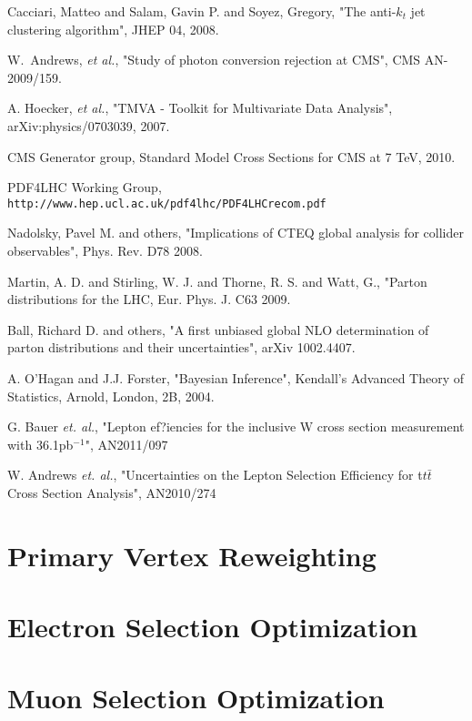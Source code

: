 \documentclass{cmspaper}
\begin{document}
Cacciari, Matteo and Salam, Gavin P. and Soyez, Gregory, "The anti-$k_t$ jet clustering 
algorithm", JHEP 04,  2008.

W.~Andrews, \textit{et al.}, "Study of photon conversion rejection at CMS", CMS AN-2009/159.

A. Hoecker, \textit{et al.}, "TMVA - Toolkit for Multivariate Data Analysis", arXiv:physics/0703039, 2007.

CMS Generator group, Standard Model Cross Sections for CMS at 7 TeV, 2010.

PDF4LHC Working Group, 
{\tt http://www.hep.ucl.ac.uk/pdf4lhc/PDF4LHCrecom.pdf}

Nadolsky, Pavel M. and others, "Implications of CTEQ global analysis for 
collider observables", Phys. Rev. D78 2008.

Martin, A. D. and Stirling, W. J. and Thorne, R. S. and Watt, G., "Parton 
distributions for the LHC, Eur. Phys. J. C63 2009.

Ball, Richard D. and others, "A first unbiased global NLO determination 
of parton distributions and their uncertainties", arXiv 1002.4407.

A. O'Hagan and J.J. Forster, "Bayesian Inference", Kendall's Advanced Theory of Statistics, 
Arnold, London, 2B, 2004.

G. Bauer {\it et. al.}, "Lepton ef?iencies for the inclusive W cross section measurement with 36.1pb$^{-1}$", AN2011/097

W. Andrews {\it et. al.}, "Uncertainties on the Lepton Selection Efficiency for t$t\bar{t}$ Cross Section Analysis", AN2010/274


\appendix
\appendixpage
  \section{Primary Vertex Reweighting}
     \label{app:vertex_reweight}
     
  \clearpage
  \section{Electron Selection Optimization}
     \label{app:els}
     
  \clearpage
  \section{Muon Selection Optimization}
     \label{app:mus}
     
  \clearpage
%     
  \clearpage
\end{document}
